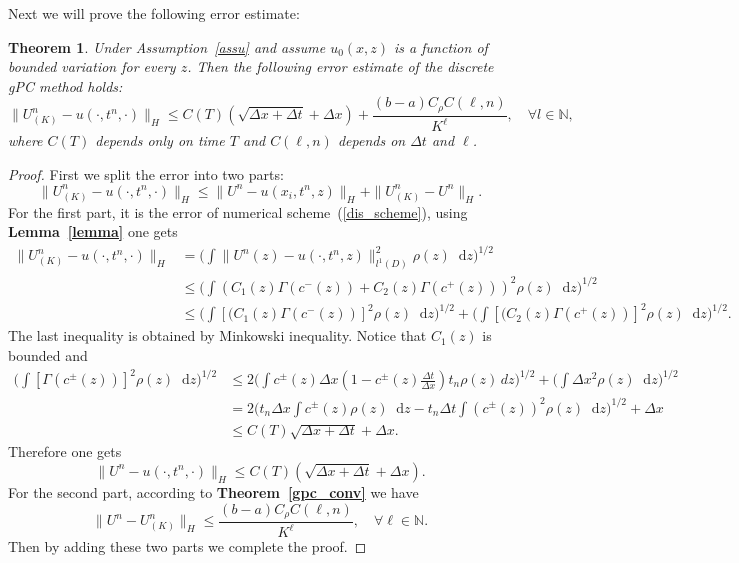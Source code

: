 \documentclass[12pt]{article}
\theoremstyle{plain}
\newtheorem{theo}{Theorem}[section]
\theoremstyle{remark}
\theoremstyle{remark}
\theoremstyle{remark}
\numberwithin{equation}{section}
\newcommand*\diff{\mathop{}\!\mathrm{d}}
\newcommand{\N}{{\mathbb{N}}}
\newcommand{\Dx}{\Delta x}
\newcommand{\Dt}{\Delta t}
\begin{document}
Next we will prove the following error estimate:
\begin{theo}
  Under Assumption~\ref{assu} and assume $u_0(x, z)$ is a function of bounded variation for every $z$. Then the following error estimate of the  discrete gPC method holds:
  \begin{equation}
    \|U^n_{(K)} - u(\cdot, t^n, \cdot)\|_H \leq C(T)(\sqrt{\Dx + \Dt} + \Dx) + \frac{(b-a)C_\rho C(\ell,n)}{K^\ell}, \quad\forall l\in\N,
  \end{equation}
  where $C(T)$ depends only on time $T$ and $C(\ell,n)$ depends on $\Dt$ and $\ell$.
\end{theo}
\begin{proof}
  First we split the error into two parts:
  \begin{equation}
    \|U^n_{(K)} - u(\cdot, t^n, \cdot)\|_H \leq \|U^n - u(x_i, t^n, z)\|_H + \|U^n_{(K)} - U^n\|_H.
  \end{equation}
  For the first part, it is the error of numerical scheme~(\ref{dis_scheme}), using {\bf Lemma~\ref{lemma}} one gets
  \begin{equation}
    \begin{split}
      \|U^n_{(K)} - u(\cdot, t^n, \cdot)\|_H &= \Bigg(\int\|U^{n}(z) - u(\cdot, t^n, z)\|_{l^1(D)}^2\rho(z)\diff z\Bigg)^{1/2} \\
      & \leq \Bigg(\int (C_1(z)\Gamma(c^-(z)) + C_2(z)\Gamma(c^+(z)))^2\rho(z)\diff z\Bigg)^{1/2} \\
      & \leq \Bigg(\int [(C_1(z)\Gamma(c^-(z))]^2\rho(z)\diff z\Bigg)^{1/2} + \Bigg(\int [(C_2(z)\Gamma(c^+(z))]^2\rho(z)\diff z\Bigg)^{1/2}.
    \end{split}
  \end{equation}
  The last inequality is obtained by Minkowski inequality. Notice that $C_1(z)$ is bounded and
  \begin{equation}
    \begin{split}
      \Bigg(\int [\Gamma(c^{\pm}(z))]^2\rho(z)\diff z\Bigg)^{1/2} & \leq 2\Bigg(\int c^{\pm}(z)\Dx(1-c^{\pm}(z)\frac{\Dt}{\Dx})t_n\rho(z)\,dz\Bigg)^{1/2} + \Bigg(\int \Dx^2\rho(z)\diff z\Bigg)^{1/2} \\
      &= 2\Bigg(t_n\Dx\int c^{\pm}(z)\rho(z)\diff z - t_n\Dt\int (c^{\pm}(z))^2\rho(z)\diff z\Bigg)^{1/2} + \Dx \\
      &\leq C(T)\sqrt{\Dx + \Dt} + \Dx.
    \end{split}
  \end{equation}
Therefore one gets
  \begin{equation}\label{err1}
    \|U^{n}- u(\cdot, t^n, \cdot)\|_H \leq C(T)(\sqrt{\Dx + \Dt} + \Dx).
  \end{equation}
  For the second part, according to {\bf Theorem~\ref{gpc_conv}} we have
  \begin{equation}
    \|U^n - U^n_{(K)}\|_H \leq \frac{(b-a)C_\rho C(\ell,n)}{K^\ell}, \quad\forall\ell\in\N.
  \end{equation}
  Then by adding these two parts we complete the proof.
\end{proof}
\end{document}
